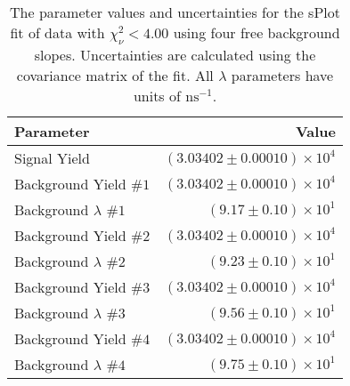 
\begin{table}[h]
    \begin{center}
        \begin{tabular}{lr}\toprule
            Parameter & Value \\\midrule
            Signal Yield & $(3.03402 \pm 0.00010) \times 10^{4}$ \\
            Background Yield $\#1$ & $(3.03402 \pm 0.00010) \times 10^{4}$ \\
            Background $\lambda$ $\#1$ & $(9.17 \pm 0.10) \times 10^{1}$ \\
            Background Yield $\#2$ & $(3.03402 \pm 0.00010) \times 10^{4}$ \\
            Background $\lambda$ $\#2$ & $(9.23 \pm 0.10) \times 10^{1}$ \\
            Background Yield $\#3$ & $(3.03402 \pm 0.00010) \times 10^{4}$ \\
            Background $\lambda$ $\#3$ & $(9.56 \pm 0.10) \times 10^{1}$ \\
            Background Yield $\#4$ & $(3.03402 \pm 0.00010) \times 10^{4}$ \\
            Background $\lambda$ $\#4$ & $(9.75 \pm 0.10) \times 10^{1}$ \\\bottomrule
        \end{tabular}
        \caption{The parameter values and uncertainties for the sPlot fit of data with $\chi^2_\nu < 4.00$ using four free background slopes. Uncertainties are calculated using the covariance matrix of the fit. All $\lambda$ parameters have units of $\si{\nano\second}^{-1}$.}
    \end{center}
\end{table}
